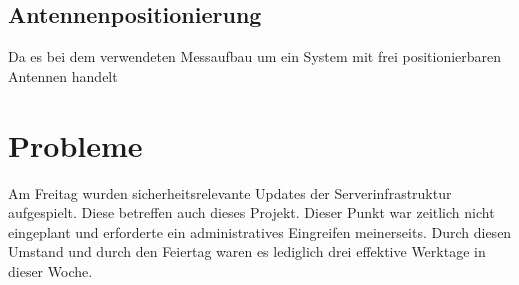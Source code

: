 \documentclass[a4paper,12pt,fleqn]{article}
\begin{document}
\subsection{Antennenpositionierung}
Da es bei dem verwendeten Messaufbau um ein System mit frei positionierbaren Antennen handelt

\section[Probleme]{Probleme}
Am Freitag wurden sicherheitsrelevante Updates der Serverinfrastruktur aufgespielt. Diese betreffen auch dieses Projekt. Dieser Punkt war zeitlich nicht eingeplant und erforderte ein administratives Eingreifen meinerseits. Durch diesen Umstand und durch den Feiertag waren es lediglich drei effektive Werktage in dieser Woche.



\newpage


\end{document}
